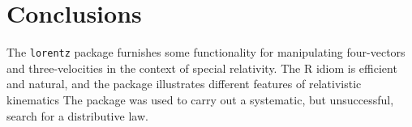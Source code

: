 \documentclass[ijoc,nonblindrev]{informs3} %
\begin{document}
\section{Conclusions}

The {\tt lorentz} package furnishes some functionality for
manipulating four-vectors and three-velocities in the context of
special relativity.  The R idiom is efficient and natural, and the
package illustrates different features of relativistic kinematics 
The package was used to carry out a systematic, but unsuccessful,
search for a distributive law.


%
%
%




\end{document}
